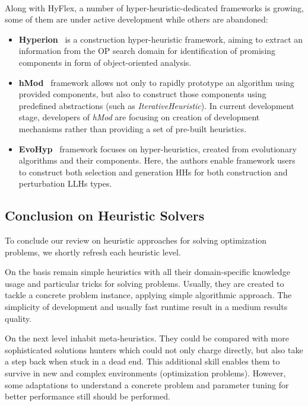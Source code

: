 \paragraph{}
Along with HyFlex, a number of hyper-heuristic-dedicated frameworks is growing, some of them are under active development while others are abandoned:
\begin{itemize}
	\item \textbf{Hyperion}~\cite{swan2011hyperion} is a construction hyper-heuristic framework, aiming to extract an information from the OP search domain for identification of promising components in form of object-oriented analysis.
	
	\item \textbf{hMod}~\cite{urra2013hMod} framework allows not only to rapidly prototype an algorithm using provided components, but also to construct those components using predefined abstractions (such as \emph{IterativeHeuristic}). In current development stage, developers of \emph{hMod} are focusing on creation of development mechanisms rather than providing a set of pre-built heuristics. 
	
	\item \textbf{EvoHyp}~\cite{pillay2017evohyp} framework focuses on hyper-heuristics, created from evolutionary algorithms and their components. Here, the authors enable framework users to construct both selection and generation HHs for both construction and perturbation LLHs types.
\end{itemize}


\subsection{Conclusion on Heuristic Solvers}
To conclude our review on heuristic approaches for solving optimization problems, we shortly refresh each heuristic level.

On the basis remain simple heuristics with all their domain-specific knowledge usage and particular tricks for solving problems. Usually, they are created to tackle a concrete problem instance, applying simple algorithmic approach. The simplicity of development and usually fast runtime result in a medium results quality.

On the next level inhabit meta-heuristics. They could be compared with more sophisticated solutions hunters which could not only charge directly, but also take a step back when stuck in a dead end. This additional skill enables them to survive in new and complex environments (optimization problems). However, some adaptations to understand a concrete problem and parameter tuning for better performance still should be performed.

